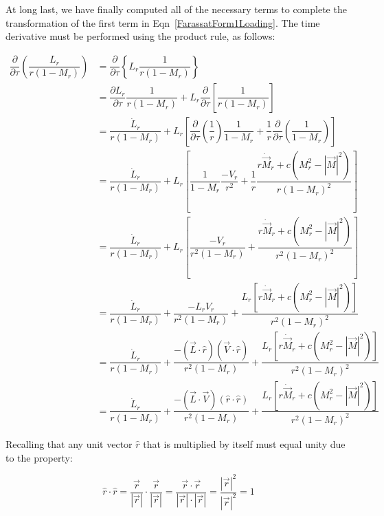 \documentclass[]{aiaa-tc}%
\begin{document}
At long last, we have finally computed all of the necessary terms to complete the transformation of the first term in Eqn~\ref{FarassatForm1Loading}.  The time derivative must be performed using the product rule, as follows:

\begin{align*}
\dfrac{\partial}{\partial \tau} \left( \dfrac{L_r}{r (1 - M_r)}  \right)
& = \dfrac{\partial}{\partial \tau} \left\{ L_r \dfrac{1}{r (1 - M_r)}  \right\} \\
& = \dfrac{\partial L_r}{\partial \tau} \dfrac{1}{r (1 - M_r)}
    + L_r\dfrac{\partial}{\partial \tau} \left[ \dfrac{1}{r (1 - M_r)} \right] \\
& = \dfrac{\dot{L}_r}{r (1 - M_r)}
    + L_r \left[
    \dfrac{\partial}{\partial\tau} \left(\dfrac{1}{r}\right) \dfrac{1}{1 - M_r}
    + \dfrac{1}{r} \dfrac{\partial}{\partial\tau} \left(\dfrac{1}{1-M_r}\right)
    \right] \\
& = \dfrac{\dot{L}_r}{r (1 - M_r)}
    + L_r \left[
    \dfrac{1}{1 - M_r} \dfrac{-V_r}{r^2}
    + \dfrac{1}{r}
    \dfrac{ r\dot{\vec{M}}_r + c \left( M_r^2 - |\vec{M}|^2 \right) }
    {r (1 - M_r)^2}
    \right] \\
& = \dfrac{\dot{L}_r}{r (1 - M_r)}
    + L_r \left[
    \dfrac{-V_r}{r^2 (1 - M_r)}
    + \dfrac{ r\dot{\vec{M}}_r + c \left( M_r^2 - |\vec{M}|^2 \right) }
        {r^2 (1 - M_r)^2}
    \right] \\
&= \dfrac{\dot{L}_r}{r (1 - M_r)}
    + \dfrac{-L_r V_r}{r^2 (1 - M_r)}
    + \dfrac{ L_r \left[
        r\dot{\vec{M}}_r + c \left( M_r^2 - |\vec{M}|^2 \right) \right] }
        {r^2 (1 - M_r)^2} \\
&= \dfrac{\dot{L}_r}{r (1 - M_r)}
    + \dfrac{-(\vec{L}\cdot\hat{r}) (\vec{V}\cdot\hat{r})}{r^2 (1 - M_r)}
    + \dfrac{ L_r \left[
        r\dot{\vec{M}}_r + c \left( M_r^2 - |\vec{M}|^2 \right) \right] }
        {r^2 (1 - M_r)^2} \\
&= \dfrac{\dot{L}_r}{r (1 - M_r)}
    + \dfrac{-(\vec{L}\cdot\vec{V}) (\hat{r}\cdot\hat{r})}{r^2 (1 - M_r)}
    + \dfrac{ L_r \left[
        r\dot{\vec{M}}_r + c \left( M_r^2 - |\vec{M}|^2 \right) \right] }
        {r^2 (1 - M_r)^2}
\end{align*}

\noindent Recalling that any unit vector $\hat{r}$ that is multiplied by itself must equal unity due to the property:

\begin{equation} \label{UnitSquared}
\hat{r}\cdot\hat{r}
= \dfrac{\vec{r}}{|\vec{r}|}\cdot\dfrac{\vec{r}}{|\vec{r}|}
= \dfrac{\vec{r}\cdot\vec{r}}{|\vec{r}|\cdot|\vec{r}|}
= \dfrac{|\vec{r}|^2}{|\vec{r}|^2} = 1
\end{equation}
\end{document}
